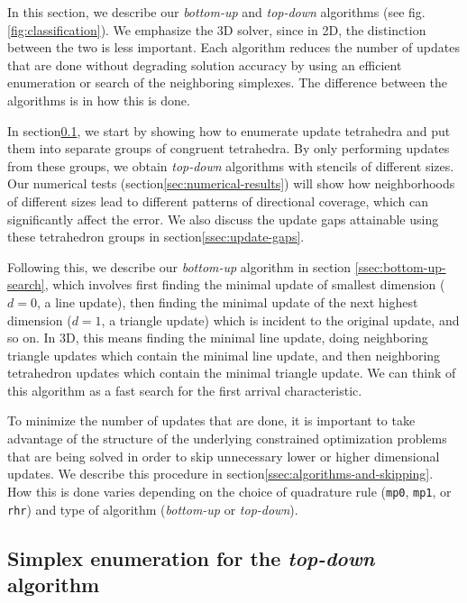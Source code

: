 \documentclass[smallcondensed]{svjour3}
\begin{document}
In this section, we describe our \emph{bottom-up} and \emph{top-down}
algorithms (see fig.\@ \ref{fig:classification}). We emphasize the 3D
solver, since in 2D, the distinction between the two is less
important. Each algorithm reduces the number of updates that are done
without degrading solution accuracy by using an efficient enumeration
or search of the neighboring simplexes. The difference between the
algorithms is in how this is done.

In section\@ \ref{ssec:simplex-enumeration}, we start by showing how
to enumerate update tetrahedra and put them into separate groups of
congruent tetrahedra. By only performing updates from these groups, we
obtain \emph{top-down} algorithms with stencils of different sizes. Our
numerical tests (section\@ \ref{sec:numerical-results}) will show how
neighborhoods of different sizes lead to different patterns of
directional coverage, which can significantly affect the error. We
also discuss the update gaps attainable using these tetrahedron groups
in section\@ \ref{ssec:update-gaps}.

Following this, we describe our \emph{bottom-up} algorithm in section\@
\ref{ssec:bottom-up-search}, which involves first finding the minimal
update of smallest dimension ($d = 0$, a line update), then finding
the minimal update of the next highest dimension ($d = 1$, a triangle
update) which is incident to the original update, and so on. In 3D,
this means finding the minimal line update, doing neighboring triangle
updates which contain the minimal line update, and then neighboring
tetrahedron updates which contain the minimal triangle update. We can
think of this algorithm as a fast search for the first arrival
characteristic.

To minimize the number of updates that are done, it is important to
take advantage of the structure of the underlying constrained
optimization problems that are being solved in order to skip
unnecessary lower or higher dimensional updates. We describe this
procedure in section\@ \ref{ssec:algorithms-and-skipping}. How this
is done varies depending on the choice of quadrature rule
(\texttt{mp0}, \texttt{mp1}, or \texttt{rhr}) and type of algorithm
(\emph{bottom-up} or \emph{top-down}).

\subsection{Simplex enumeration for the \emph{top-down}
  algorithm}\label{ssec:simplex-enumeration}
\end{document}
